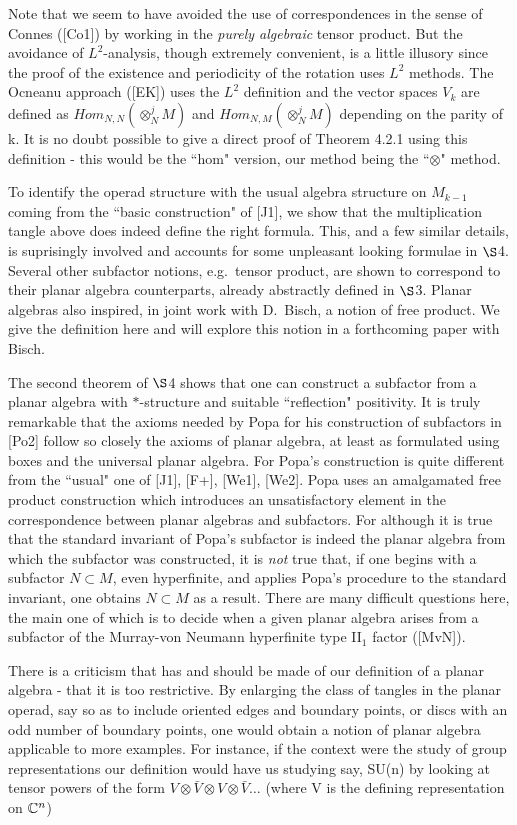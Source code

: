 Note that we seem to have avoided the use of
correspondences in the sense of Connes ([Co1]) by
working in the {\it purely algebraic} tensor
product. But the avoidance of $L^2$-analysis,
though extremely convenient, is a little illusory
since the proof of the existence and periodicity
of the rotation uses $L^2$ methods. The Ocneanu
approach ([EK]) uses the $L^2$ definition and the vector spaces $V_k$ are defined
as $Hom_{N,N}(\otimes^j_N M)$ and $Hom_{N,M}(\otimes^j_N M)$
depending on the parity of k. It is no doubt possible
to give a direct proof of Theorem 4.2.1 using this
definition - this would be the ``hom" 
version, our method being the ``$\otimes$" 
method.

To identify the operad structure with the usual
algebra structure on $M_{k-1}$ coming from the
``basic construction" of [J1], we show that the
multiplication tangle above does indeed define the
right formula. This, and a few similar details, is
suprisingly involved and accounts for some
unpleasant looking formulae in $\S$4. Several other
subfactor notions, e.g.~tensor product, are shown
to correspond to their planar algebra
counterparts, already abstractly defined in $\S$3.
Planar algebras also inspired, in joint work with
D.~Bisch, a notion of free product. We give the
definition here and will explore this notion in a
forthcoming paper with Bisch.

The second theorem of $\S$4 shows that one can
construct a subfactor from a planar algebra with
$*$-structure and suitable ``reflection"
positivity. It is truly remarkable that the axioms
needed by Popa for his construction of subfactors
in [Po2] follow so closely the axioms of planar
algebra, at least as formulated using boxes and
the universal planar algebra. For Popa's construction is
quite different from the ``usual" one of
[J1], [F+], [We1], [We2]. Popa uses an
amalgamated free product construction which
introduces an unsatisfactory element in the
correspondence between planar algebras and
subfactors. For although it is true that the
standard invariant of Popa's subfactor  is indeed
the planar algebra from which the subfactor was
constructed, it is {\it not} true that, if one
begins with a subfactor $N\subset M$, even
hyperfinite, and applies Popa's procedure to the
standard invariant, one obtains $N\subset M$ as a
result. There are many difficult questions here,
the main one of which is to decide when a given
planar algebra arises from a subfactor of the
Murray-von Neumann hyperfinite type II${}_1$
factor ([MvN]).

There is a criticism that has and should be made of 
our definition of a planar algebra - that it is
too restrictive. By enlarging the class of tangles in the   
planar operad, say so as to include oriented edges and 
boundary points, or discs with an odd number of 
boundary points, one would obtain a notion of planar
algebra applicable to more examples. For instance,
if the context were the study of group representations
our definition would have us studying say, SU(n) by 
looking at tensor powers of the form ${V\otimes\bar V\otimes V\otimes \bar V\dots}$
(where V is the defining representation on $\Bbb C^n$)



